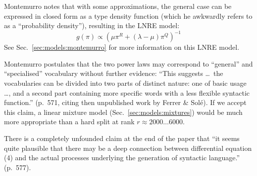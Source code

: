 \documentclass[a4paper]{article}
\begin{document}
Montemurro notes that with some approximations, the general case can be expressed in closed form as a type density function (which he awkwardly refers to as a ``probability density''), resulting in the LNRE model:
\begin{equation}
  \label{eq:lit:ext:Montemurro2001:4}
  g(\pi) \propto \left( \mu \pi^R + (\lambda-\mu) \pi^Q \right)^{-1}
\end{equation}
See Sec.~\ref{sec:models:montemurro} for more information on this LNRE model.

Montemurro postulates that the two power laws may correspond to ``general'' and ``specialised'' vocabulary without further evidence: ``This suggests \ldots\ the vocabularies can be divided into two parts of distinct nature: one of basic usage \dots, and a second part containing more specific words with a less flexible syntactic function.'' (p.~571, citing then unpublished work by Ferrer \& Solé).  If we accept this claim, a linear mixture model (Sec.~\ref{sec:models:mixtures}) would be much more appropriate than a hard split at rank $r\approx 2000 \ldots 6000$.

There is a completely unfounded claim at the end of the paper that ``it seems quite plausible that there may be a deep connection between differential equation (4) and the actual processes underlying the generation of syntactic language.'' (p.~577).



  
\end{document}
